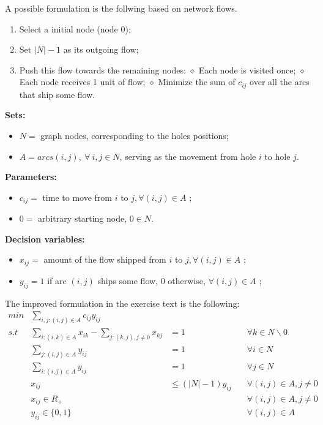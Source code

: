 \documentclass[a4paper,12pt]{article}
\begin{document}
			A possible formulation is the follwing based on network flows.
			\begin{enumerate}
				\item Select a initial node (node 0);
				\item Set $ |N| - 1  $ as its outgoing flow;
				\item Push this flow towards the remaining nodes:
					\subitem $\diamond$ Each node is visited once;					
					\subitem $\diamond$ Each node receives 1 unit of flow;
					\subitem $\diamond$ Minimize the sum of $ c_{ij} $ over all the arcs that ship some flow.
			\end{enumerate}
			
			\hspace{-20pt}\textbf{Sets:}
			\begin{itemize}
				\item $ N = $ graph nodes, corresponding to the holes positions;
				\item $ A = arcs (i,j),\  \forall \ i,j \in N $, serving as the movement from hole $ i $ to hole $ j $.
			\end{itemize}
		
			\hspace{-20pt}\textbf{Parameters:}
			\begin{itemize}
				\item $ c_{ij} = $ time to move from $ i $ to $j,\forall (i,j) \in A $ ;
				\item $ 0 = $ arbitrary starting node, $ 0 \in N $.
			\end{itemize}
		
			\hspace{-20pt}\textbf{Decision variables:}
			\begin{itemize}
				\item $ x_{ij} = $ amount of the flow shipped from $ i $ to $j,\forall (i,j) \in A $ ;
				\item $ y_{ij} = 1 $ if arc $ (i,j) $ ships some flow, $ 0 $ otherwise, $\forall (i,j) \in A $ ;
			\end{itemize}
		
			The improved formulation in the exercise text is the following:
			\begin{align}
				min &\sum_{i,j:(i,j)\in A} c_{ij} y_{ij}\\
				s.t &\sum_{i:(i,k)\in A} x_{ik} - \sum_{j:(k,j),j\ne 0} x_{kj} 	&= 1 \qquad\qquad\qquad 	&\forall k \in N \backslash 0 \\
				&\sum_{j:(i,j)\in A} y_{ij}									   	&= 1 \qquad \qquad \qquad 	&\forall i \in N \\
				&\sum_{i:(i,j)\in A} y_{ij}									   	&= 1 \qquad \qquad \qquad 	&\forall j \in N \\
				&x_{ij}  													   	&\le (|N|-1) y_{ij} \quad 	&\forall (i,j) \in A, j\ne 0 \\
				&x_{ij}  \in R_+ 												&   						&\forall (i,j) \in A, j\ne 0 \\
				&y_{ij}  \in \{0,1\} 											&  							&\forall (i,j) \in A 
			\end{align}
		
\end{document}
